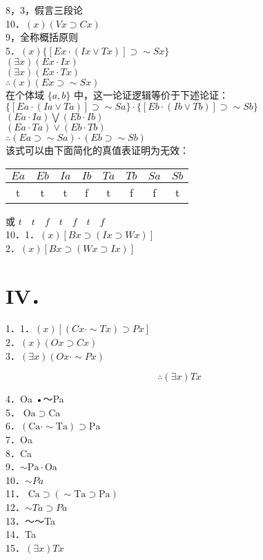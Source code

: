8，3，假言三段论\\
10．$(x)(V x \supset C x)$\\
9，全称概括原则\\
5．$(x)\{[E x \cdot(I x \vee T x)] \supset \sim S x\}$\\
$(\exists x)(E x \cdot I x)$\\
$(\exists x)(E x \cdot T x)$\\
$\therefore(x)(E x \supset \sim S x)$\\
在个体域 $\{a, b\}$ 中，这一论证逻辑等价于下述论证：\\
$\{[E a \cdot(I a \vee T a)] \supset \sim S a\} \cdot\{[E b \cdot(I b \vee T b)] \supset \sim S b\}$\\
$(E a \cdot I a) \bigvee(E b \cdot I b)$\\
$(E a \cdot T a) \vee(E b \cdot T b)$\\
$\therefore(E a \supset \sim S a) \cdot(E b \supset \sim S b)$\\
该式可以由下面简化的真值表证明为无效：

\begin{center}
\begin{tabular}{cccccccc}
$E a$ & $E b$ & $I a$ & $I b$ & $T a$ & $T b$ & $S a$ & $S b$ \\
\hline
t & t & t & f & t & f & f & t \\
\hline
\end{tabular}
\end{center}

或 $t \quad t \quad f \quad t \quad f \quad t \quad f$\\
10．1．$(x)[B x \supset(I x \supset W x)]$\\
2．$(x)[B x \supset(W x \supset I x)]$

\section*{IV．}
1．1．$(x)[(C x \cdot \sim T x) \supset P x]$\\
2．$(x)(O x \supset C x)$\\
3．$(\exists x)(O x \cdot \sim P x)$

$$
\therefore(\exists x) T x
$$

4．Oa •～Pa\\
5． $\mathrm{Oa} \supset \mathrm{Ca}$\\
6．$(\mathrm{Ca} \cdot \sim \mathrm{Ta}) \supset \mathrm{Pa}$\\
7．Oa\\
8．Ca\\
9．$\sim \mathrm{Pa} \cdot \mathrm{Oa}$\\
10．$\sim P a$\\
11． $\mathrm{Ca} \supset(\sim \mathrm{Ta} \supset \mathrm{Pa})$\\
12．$\sim T a \supset P a$\\
13．～～Ta\\
14．Ta\\
15．$(\exists x) T x$

